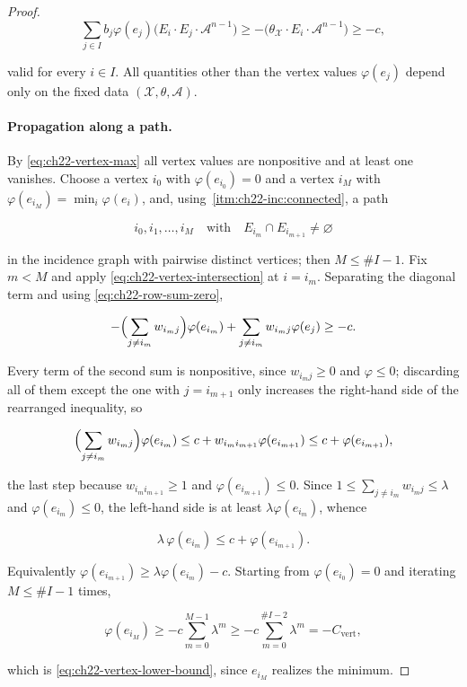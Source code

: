 \begin{proof}
\[
 \sum_{j\in I} b_j\varphi(e_j)
       \bigl(E_i\cdot E_j\cdot\mathcal A^{n-1}\bigr)
 \geq
 -\bigl(\theta_{\mathcal X}\cdot E_i\cdot\mathcal A^{n-1}\bigr)
 \geq-c,
\tag{22.28}\label{eq:ch22-vertex-intersection}
\]

valid for every \(i\in I\).  All quantities other than the vertex values
\(\varphi(e_j)\) depend only on the fixed data
\((\mathcal X,\theta,\mathcal A)\).

\paragraph{Propagation along a path.}
By \eqref{eq:ch22-vertex-max} all vertex values are nonpositive and at least
one vanishes.  Choose a vertex \(i_0\) with \(\varphi(e_{i_0})=0\) and a
vertex \(i_M\) with \(\varphi(e_{i_M})=\min_i\varphi(e_i)\), and, using
\,\cref{itm:ch22-inc:connected}, a path

\[
             i_0,i_1,\ldots,i_M
             \quad\text{with}\quad
             E_{i_m}\cap E_{i_{m+1}}\neq\varnothing
\tag{22.29}\label{eq:ch22-vertex-path}
\]

in the incidence graph with pairwise distinct vertices; then
\(M\leq\#I-1\).  Fix \(m<M\) and apply
\eqref{eq:ch22-vertex-intersection} at \(i=i_m\).  Separating the diagonal
term and using \eqref{eq:ch22-row-sum-zero},

\[
 -\Bigl(\sum_{j\neq i_m}w_{i_mj}\Bigr)\varphi(e_{i_m})
 +\sum_{j\neq i_m}w_{i_mj}\varphi(e_j)\geq-c .
\]

Every term of the second sum is nonpositive, since \(w_{i_mj}\geq0\) and
\(\varphi\leq0\); discarding all of them except the one with
\(j=i_{m+1}\) only increases the right-hand side of the rearranged
inequality, so

\[
 \Bigl(\sum_{j\neq i_m}w_{i_mj}\Bigr)\varphi(e_{i_m})
 \leq c+w_{i_mi_{m+1}}\varphi(e_{i_{m+1}})
 \leq c+\varphi(e_{i_{m+1}}),
\]

the last step because \(w_{i_mi_{m+1}}\geq1\) and
\(\varphi(e_{i_{m+1}})\leq0\).  Since
\(1\leq\sum_{j\neq i_m}w_{i_mj}\leq\lambda\) and
\(\varphi(e_{i_m})\leq0\), the left-hand side is at least
\(\lambda\varphi(e_{i_m})\), whence

\[
               \lambda\,\varphi(e_{i_m})
               \leq c+\varphi(e_{i_{m+1}}).
\tag{22.30}\label{eq:ch22-path-recursion}
\]

Equivalently \(\varphi(e_{i_{m+1}})\geq\lambda\varphi(e_{i_m})-c\).
Starting from \(\varphi(e_{i_0})=0\) and iterating \(M\leq\#I-1\) times,

\[
 \varphi(e_{i_M})
 \geq-c\sum_{m=0}^{M-1}\lambda^m
 \geq-c\sum_{m=0}^{\#I-2}\lambda^m
 =-C_{\mathrm{vert}} ,
\]

which is \eqref{eq:ch22-vertex-lower-bound}, since \(e_{i_M}\) realizes the
minimum.
\end{proof}

